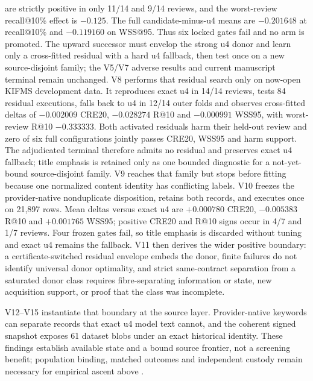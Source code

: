 \documentclass[11pt]{article}
\theoremstyle{definition}
\newcommand{\idt}[1]{\path{#1}}
\begin{document}
are strictly positive in only 11/14 and 9/14 reviews, and the worst-review
recall@10\% effect is $-0.125$. The full candidate-minus-u4 means are
$-0.201648$ at recall@10\% and $-0.119160$ on WSS@95. Thus six locked gates
fail and no arm is promoted. The upward successor must envelop the strong u4
donor and learn only a cross-fitted residual with a hard u4 fallback, then test
once on a new source-disjoint family; the V5/V7 adverse results and current
manuscript terminal remain unchanged. V8 performs that residual search only on
now-open KIFMS development data. It reproduces exact u4 in 14/14 reviews, tests
84 residual executions, falls back to u4 in 12/14 outer folds and observes
cross-fitted deltas of $-0.002009$ CRE20, $-0.028274$ R@10 and $-0.000991$
WSS95, with worst-review R@10 $-0.333333$. Both activated residuals harm their
held-out review and zero of six full configurations jointly passes CRE20,
WSS95 and harm support. The adjudicated terminal therefore admits no residual
and preserves exact u4 fallback; title emphasis is retained only as one bounded
diagnostic for a not-yet-bound source-disjoint family. V9 reaches that family
but stops before fitting because one normalized content identity has conflicting
labels. V10 freezes the provider-native nonduplicate disposition, retains both
records, and executes once on 21,897 rows. Mean deltas versus exact u4 are
$+0.000780$ CRE20, $-0.005383$ R@10 and $+0.001765$ WSS95; positive CRE20 and
R@10 signs occur in 4/7 and 1/7 reviews. Four frozen gates fail, so title
emphasis is discarded without tuning and exact u4 remains the fallback. V11
then derives the wider positive boundary: a certificate-switched residual
envelope embeds the donor, finite failures do not identify universal donor
optimality, and strict same-contract separation from a saturated donor class
requires fibre-separating information or state, new acquisition support, or
proof that the class was incomplete.

V12--V15 instantiate that boundary at the source layer.  Provider-native
keywords can separate records that exact u4 model text cannot, and the coherent
signed snapshot exposes 61 dataset blobs under an exact historical identity.
These findings establish available state and a bound source frontier, not a
screening benefit; population binding, matched outcomes and independent custody
remain necessary for empirical ascent above \idt{P2_NARROWED}.



\end{document}
